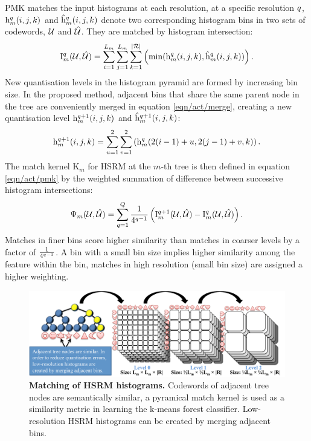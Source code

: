 PMK matches the input histograms at each resolution, at a specific resolution $q$, $\mathrm{h}^q_{m}(i,j,k)$ and $\mathrm{\hat{h}}^q_{m}(i,j,k)$ denote two corresponding histogram bins in two sets of codewords, $\mathcal{U}$ and $\mathcal{\hat{U}}$. They are matched by histogram intersection:
\begin{equation}
	\label{eqn/act/hik}
	\mathrm{I}_{m}^q(\mathcal{U},\mathcal{\hat{U}}) =  \displaystyle\sum_{i=1}^{L_m}\sum_{j=1}^{L_m}\sum_{k=1}^{|\mathcal{R}|} \left( \min(\mathrm{h}^{q}_m(i,j,k), \mathrm{\hat{h}}^{q}_m(i,j,k)) \right).
\end{equation}
New quantisation levels in the histogram pyramid are formed by increasing bin size. In the proposed method, adjacent bins that share the same parent node in the tree are conveniently merged in equation \ref{eqn/act/merge}, creating a new quantisation level $\mathrm{h}^{q+1}_m(i,j,k)$ and $\mathrm{\hat{h}}^{q+1}_m(i,j,k)$:
\begin{equation}
	\label{eqn/act/merge}
	\mathrm{h}^{q+1}_m(i,j,k) = \displaystyle\sum_{u=1}^{2}\sum_{v=1}^{2} \left( \mathrm{h}^{q}_m(2(i-1)+u,2(j-1)+v,k) \right).
\end{equation}
The match kernel $\mathrm{K}_m$ for HSRM at the $m$-th tree is then defined in equation \ref{eqn/act/pmk} by the weighted summation of difference between successive histogram intersections:
\begin{equation}
	\label{eqn/act/pmk}
	\Psi_m(\mathcal{U},\mathcal{\hat{U}}) = \displaystyle\sum_{q = 1}^{Q}\frac{1}{4^{q-1}} \left( \mathrm{I}_{m}^{q+1}(\mathcal{U},\mathcal{\hat{U}}) - \mathrm{I}_{m}^{q}(\mathcal{U},\mathcal{\hat{U}}) \right).
\end{equation}
Matches in finer bins score higher similarity than matches in coarser levels by a factor of $\frac{1}{4^{q-1}}$. A bin with a small bin size implies higher similarity among the feature within the bin, matches in high resolution (small bin size) are assigned a higher weighting.  

\begin{figure}[ht]
	\centering	
	\includegraphics[width=1\linewidth]{fig/act/act_hsrm_match.pdf} 
	\caption{\textbf{Matching of HSRM histograms.} Codewords of adjacent tree nodes are semantically similar, a pyramical match kernel is used as a similarity metric in learning the k-means forest classifier. Low-resolution HSRM histograms can be created by merging adjacent bins.}
	\label{fig/act/hsrm2}
\end{figure}

